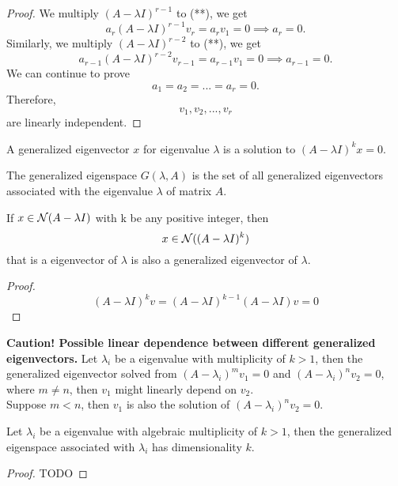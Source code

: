 \begin{refsection}
\begin{proof}
We multiply $(A-\lambda I)^{r-1}$ to (**), we get
$$ a_r(A - \lambda I)^{r-1}v_r = a_rv_1 = 0 \implies a_r = 0.$$
Similarly, we multiply $(A-\lambda I)^{r-2}$ to (**), we get
$$ a_{r-1}(A - \lambda I)^{r-2}v_{r-1} = a_{r-1}v_1 = 0 \implies a_{r-1} = 0.$$
We can continue to prove $$a_1=a_2=...=a_r = 0.$$ 
Therefore, $$v_1,v_2,...,v_r$$ are linearly independent.
\end{proof}



\begin{definition}
	A generalized eigenvector $x$ for eigenvalue $\lambda$ is a solution to $(A-\lambda I)^k x = 0$.
\end{definition}

\begin{definition}
	The generalized eigenspace $G(\lambda,A)$ is the set of all generalized eigenvectors associated with the eigenvalue $\lambda$ of matrix $A$.
\end{definition}

\begin{lemma}
	If $x \in \mathcal{N}(A-\lambda I)$ with k be any positive integer, then $$x \in \mathcal{N}((A-\lambda I)^k)$$
	that is a eigenvector of $\lambda$ is also a generalized eigenvector of $\lambda$.
\end{lemma}
\begin{proof}
	$$(A-\lambda I )^k v = (A-\lambda I )^{k-1} (A-\lambda I )v = 0$$
\end{proof}


\begin{mdframed}
	\textbf{Caution! Possible linear dependence between different generalized eigenvectors.} Let $\lambda_i$ be a eigenvalue with multiplicity of $k>1$, then the generalized eigenvector solved from $(A-\lambda_i)^m v_1 = 0$ and $(A-\lambda_i)^n v_2 = 0$, where $m \neq n$, then $v_1$ might linearly depend on $v_2$. \\
	Suppose $m < n$, then $v_1$ is also the solution of $(A-\lambda_i)^n v_2 = 0$.
\end{mdframed}

\begin{lemma}
	Let $\lambda_i$ be a eigenvalue with algebraic multiplicity of $k>1$, then the generalized eigenspace associated with $\lambda_i$ has dimensionality $k$.
\end{lemma}
\begin{proof}
	TODO
\end{proof}



\end{refsection}
